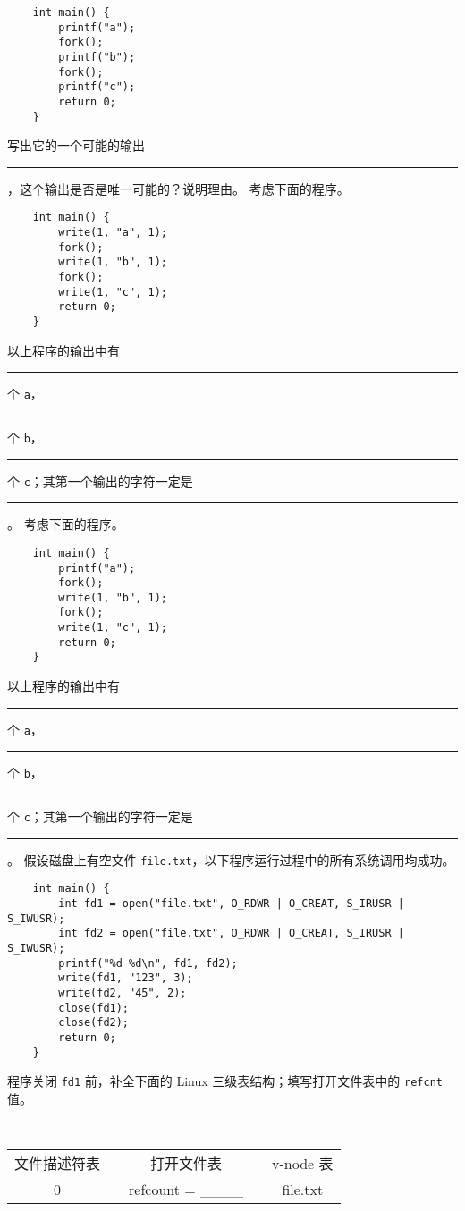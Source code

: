 \begin{problems}
\begin{verbatim}
    int main() {
        printf("a");
        fork();
        printf("b");
        fork();
        printf("c");
        return 0;
    }
        \end{verbatim}
        写出它的一个可能的输出 \rule{3.5cm}{0.25mm}，这个输出是否是唯一可能的？说明理由。
        \qn 考虑下面的程序。
        \begin{verbatim}
    int main() {
        write(1, "a", 1);
        fork();
        write(1, "b", 1);
        fork();
        write(1, "c", 1);
        return 0;
    }
        \end{verbatim}
        以上程序的输出中有 \rule{1cm}{0.25mm} 个 \verb|a|，\rule{1cm}{0.25mm} 个 \verb|b|，\rule{1cm}{0.25mm} 个 \verb|c|；其第一个输出的字符一定是 \rule{1cm}{0.25mm}。
        \qn 考虑下面的程序。
        \begin{verbatim}
    int main() {
        printf("a");
        fork();
        write(1, "b", 1);
        fork();
        write(1, "c", 1);
        return 0;
    }
        \end{verbatim}
        以上程序的输出中有 \rule{1cm}{0.25mm} 个 \verb|a|，\rule{1cm}{0.25mm} 个 \verb|b|，\rule{1cm}{0.25mm} 个 \verb|c|；其第一个输出的字符一定是 \rule{1cm}{0.25mm}。
        \pro 假设磁盘上有空文件 \verb|file.txt|，以下程序运行过程中的所有系统调用均成功。
        \begin{verbatim}
    int main() {
        int fd1 = open("file.txt", O_RDWR | O_CREAT, S_IRUSR | S_IWUSR); 
        int fd2 = open("file.txt", O_RDWR | O_CREAT, S_IRUSR | S_IWUSR); 
        printf("%d %d\n", fd1, fd2);
        write(fd1, "123", 3);
        write(fd2, "45", 2);
        close(fd1);
        close(fd2);
        return 0;
    }
        \end{verbatim}
        \qn 程序关闭 \verb|fd1| 前，补全下面的 Linux 三级表结构；填写打开文件表中的 \verb|refcnt| 值。
        \begin{table}[H]
            \tt
            \centering
            \begin{tabular}{ccccc}
                文件描述符表 & {\qquad \qquad \qquad} & 打开文件表 & {\qquad \qquad \qquad} & v-node 表 \\ \cline{1-1} \cline{3-3} \cline{5-5} 
                \multicolumn{1}{|c|}{0} & \multicolumn{1}{c|}{} & \multicolumn{1}{c|}{\multirow{2}{*}{refcount = \_\_\_\_}} & \multicolumn{1}{c|}{} & \multicolumn{1}{c|}{\multirow{6}{*}{file.txt}} \\ \cline{1-1}

\end{tabular}
\end{table}
\end{problems}
